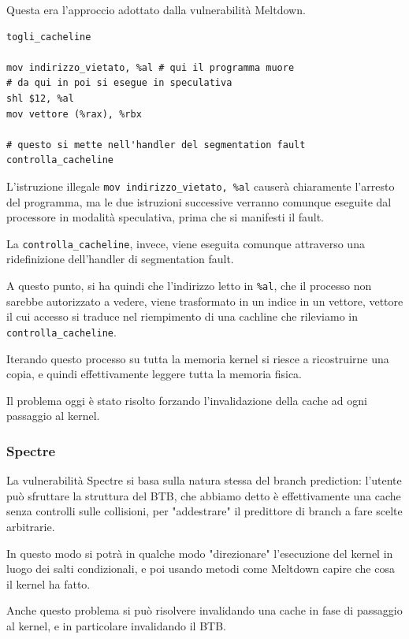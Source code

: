 \documentclass[a4paper,11pt]{article}
\begin{document}
Questa era l'approccio adottato dalla vulnerabilità Meltdown.
\begin{lstlisting}	
togli_cacheline

mov indirizzo_vietato, %al # qui il programma muore
# da qui in poi si esegue in speculativa
shl $12, %al
mov vettore (%rax), %rbx

# questo si mette nell'handler del segmentation fault
controlla_cacheline
\end{lstlisting}

L'istruzione illegale \lstinline|mov indirizzo_vietato, %al| causerà chiaramente l'arresto del programma, ma le due istruzioni successive verranno comunque eseguite dal processore in modalità speculativa, prima che si manifesti il fault.

La \lstinline|controlla_cacheline|, invece, viene eseguita comunque attraverso una ridefinizione dell'handler di segmentation fault.

A questo punto, si ha quindi che l'indirizzo letto in \lstinline|%al|, che il processo non sarebbe autorizzato a vedere, viene trasformato in un indice in un vettore, vettore il cui accesso si traduce nel riempimento di una cachline che rileviamo in \lstinline|controlla_cacheline|.

Iterando questo processo su tutta la memoria kernel si riesce a ricostruirne una copia, e quindi effettivamente leggere tutta la memoria fisica.

Il problema oggi è stato risolto forzando l'invalidazione della cache ad ogni passaggio al kernel.

\subsubsection{Spectre}
La vulnerabilità Spectre si basa sulla natura stessa del branch prediction: l'utente può sfruttare la struttura del BTB, che abbiamo detto è effettivamente una cache senza controlli sulle collisioni, per "addestrare" il predittore di branch a fare scelte arbitrarie.

In questo modo si potrà in qualche modo "direzionare" l'esecuzione del kernel in luogo dei salti condizionali, e poi usando metodi come Meltdown capire che cosa il kernel ha fatto.

Anche questo problema si può risolvere invalidando una cache in fase di passaggio al kernel, e in particolare invalidando il BTB.
\end{document}
